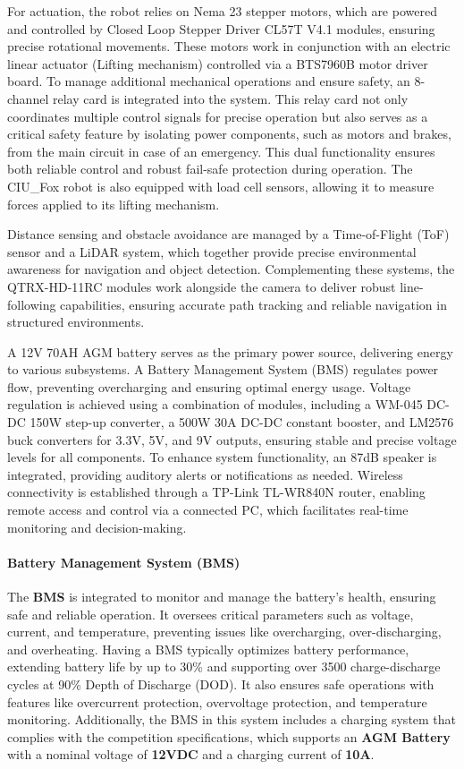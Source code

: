 \documentclass[../../main]{subfiles}
\begin{document}
For actuation, the robot relies on Nema 23 stepper motors, which are powered and controlled 
by Closed Loop Stepper Driver CL57T V4.1 modules, ensuring precise rotational movements. 
These motors work in conjunction with an electric linear actuator (Lifting mechanism) controlled via a BTS7960B 
motor driver board. To manage additional mechanical operations and ensure safety, an 8-channel relay card is integrated into the system. 
This relay card not only coordinates multiple control signals for precise operation but also serves as a critical safety feature by isolating 
power components, such as motors and brakes, from the main circuit in case of an emergency. This dual functionality ensures both reliable control 
and robust fail-safe protection during operation. The CIU\_Fox robot is also equipped with load cell sensors, allowing it to measure 
forces applied to its lifting mechanism. 

Distance sensing and obstacle avoidance are managed by a Time-of-Flight (ToF) sensor and a LiDAR system, which together provide precise environmental 
awareness for navigation and object detection. Complementing these systems, the QTRX-HD-11RC modules work alongside the camera to deliver robust 
line-following capabilities, ensuring accurate path tracking and reliable navigation in structured environments.

A 12V 70AH AGM battery serves as the primary power source, 
delivering energy to various subsystems. A Battery Management 
System (BMS) regulates power flow, preventing overcharging 
and ensuring optimal energy usage. Voltage regulation is 
achieved using a combination of modules, including a WM-045 
DC-DC 150W step-up converter, a 500W 30A DC-DC constant 
booster, and LM2576 buck converters for 3.3V, 5V, and 9V 
outputs, ensuring stable and precise voltage levels for all 
components. To enhance system functionality, an 87dB speaker 
is integrated, providing auditory alerts or notifications as 
needed. Wireless connectivity is established through a 
TP-Link TL-WR840N router, enabling remote access and control 
via a connected PC, which facilitates real-time monitoring 
and decision-making.

\paragraph{Battery Management System (BMS)}

The \textbf{BMS} is integrated to monitor and manage the battery's health, 
ensuring safe and reliable operation. It oversees critical parameters such as voltage, current, and temperature,
preventing issues like overcharging, over-discharging, and overheating. Having a BMS typically optimizes battery performance, 
extending battery life by up to 30\% and supporting over 3500 charge-discharge cycles at 90\% Depth of Discharge (DOD). 
It also ensures safe operations with features like overcurrent protection, overvoltage protection, and temperature monitoring. 
Additionally, the BMS in this system includes a charging system that complies with the competition specifications, 
which supports an \textbf{AGM Battery} with a nominal voltage of \textbf{12VDC} and a charging current of \textbf{10A}.
\end{document}
